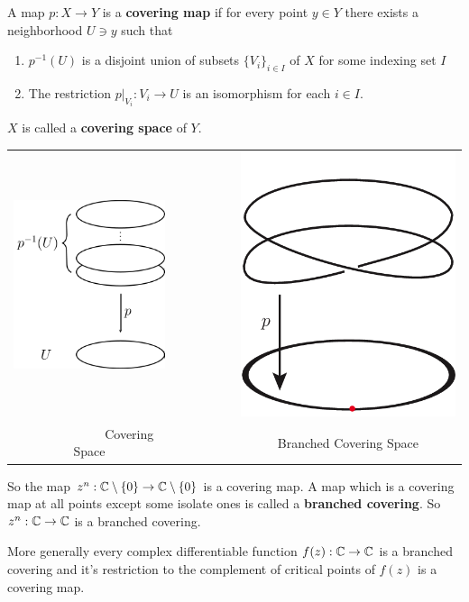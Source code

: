 \begin{definition}
	A map $p: X \rightarrow Y$ is a \textbf{covering map} if for every point $y \in Y$ there exists a neighborhood $U \ni y$ such that
	\begin{enumerate}
		\item $p^{-1}(U)$ is a disjoint union of subsets $\{ V_i \}_{i \in I}$ of $X$ for some indexing set $I$
		\item The restriction $p|_{V_i} : V_i \rightarrow U$ is an isomorphism for each $i \in I$.
	\end{enumerate}
	$X$ is called a \textbf{covering space} of $Y$.\\
\end{definition}

\begin{center}
	\begin{tabular}{ccc}
		\includegraphics[width=0.35\linewidth]{images/covering_space} & $\qquad \qquad$ &
		\includegraphics[width=0.25\linewidth]{images/branched_covering_space} \\
		$\qquad \qquad \qquad$ Covering Space                         &                 & Branched Covering Space
	\end{tabular}
\end{center}


So the map $z^n : \mathbb{C} \setminus \{ 0\} \rightarrow \mathbb{C} \setminus \{ 0 \}$ is a covering map. A map which is a covering map at all points except some isolate ones is called a \textbf{branched covering}. So $z^n: \mathbb{C} \rightarrow \mathbb{C}$ is a branched covering.

More generally every complex differentiable function $f(z):\mathbb{C} \rightarrow \mathbb{C}$ is a branched covering and it's restriction to the complement of critical points of $f(z)$ is a covering map.


